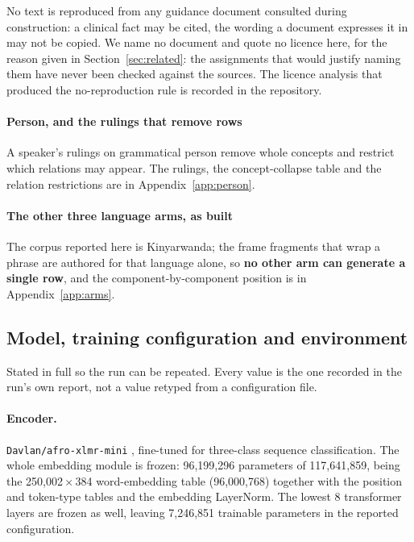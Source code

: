 No text is reproduced from any guidance document consulted during construction:
a clinical fact may be cited, the wording a document expresses it in may not be
copied. We name no document and quote no licence here, for the reason given in
Section~\ref{sec:related}: the assignments that would justify naming them have
never been checked against the sources. The licence analysis that produced the
no-reproduction rule is recorded in the repository.

\paragraph{Person, and the rulings that remove rows}

A speaker's rulings on grammatical person remove whole concepts and restrict which
relations may appear. The rulings, the concept-collapse table and the relation
restrictions are in Appendix~\ref{app:person}.

\paragraph{The other three language arms, as built}

The corpus reported here is Kinyarwanda; the frame fragments that wrap a phrase
are authored for that language alone, so \textbf{no other arm can generate a
single row}, and the component-by-component position is in
Appendix~\ref{app:arms}.

\subsection{Model, training configuration and environment}
\label{sec:method:training}

Stated in full so the run can be repeated. Every value is the one recorded in
the run's own report, not a value retyped from a configuration file.

\paragraph{Encoder.} \texttt{Davlan/afro-xlmr-mini}
\cite{alabi2022afroxlmr}, fine-tuned for
three-class sequence classification. The whole embedding module is frozen:
96{,}199{,}296 parameters of 117{,}641{,}859, being the
250{,}002\,$\times$\,384 word-embedding table (96{,}000{,}768) together with
the position and token-type tables and the embedding LayerNorm. The lowest 8
transformer layers are frozen as well, leaving 7{,}246{,}851 trainable
parameters in the reported configuration.

